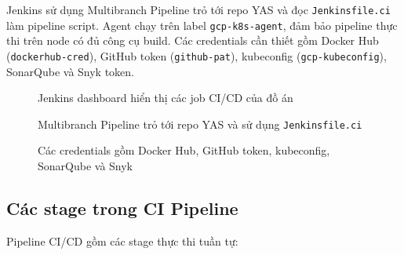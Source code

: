 Jenkins sử dụng Multibranch Pipeline trỏ tới repo YAS và đọc \texttt{Jenkinsfile.ci} làm pipeline script. Agent chạy trên label \texttt{gcp-k8s-agent}, đảm bảo pipeline thực thi trên node có đủ công cụ build. Các credentials cần thiết gồm Docker Hub (\texttt{dockerhub-cred}), GitHub token (\texttt{github-pat}), kubeconfig (\texttt{gcp-kubeconfig}), SonarQube và Snyk token.

\begin{figure}[H]
\centering
{}
\caption{Jenkins dashboard hiển thị các job CI/CD của đồ án}
\end{figure}

\begin{figure}[H]
\centering
{}
\caption{Multibranch Pipeline trỏ tới repo YAS và sử dụng \texttt{Jenkinsfile.ci}}
\end{figure}

\begin{figure}[H]
\centering
{}
\caption{Các credentials gồm Docker Hub, GitHub token, kubeconfig, SonarQube và Snyk}
\end{figure}

\subsection{Các stage trong CI Pipeline}

Pipeline CI/CD gồm các stage thực thi tuần tự:

